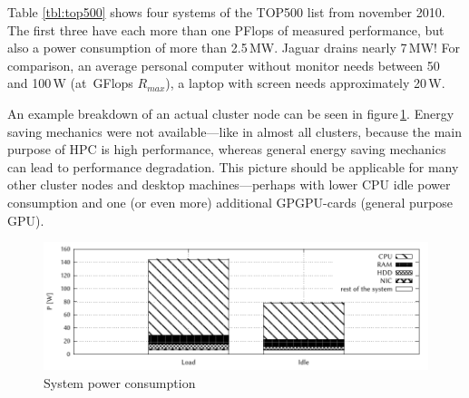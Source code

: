 Table \ref{tbl:top500} shows four systems of the TOP500 list from november 2010. The first three have each more than one PFlops of measured performance, but also a power consumption of more than 2.5\,MW.
Jaguar drains nearly 7\,MW! For comparison, an average personal computer without monitor needs between 50 and 100\,W (at \,GFlops $R_{max}$), a laptop with screen needs approximately 20\,W. 

An example breakdown of an actual cluster node can be seen in figure\,\ref{fig:powerconsumption}. Energy saving mechanics were not available---like in almost all clusters, because the main purpose of HPC is high performance, whereas general energy saving mechanics can lead to performance degradation. This picture should be applicable for many other cluster nodes and desktop machines---perhaps with lower CPU idle power consumption and one (or even more) additional GPGPU-cards (general purpose GPU).

%
\begin{figure}[H]
	\centering
	\includegraphics[width=\linewidth]{pix/systemconsumption/systemconsumption}
	\caption[System power consumption]{System power consumption\cite{minartz}}
	\label{fig:powerconsumption}
\end{figure}
%

%
%
